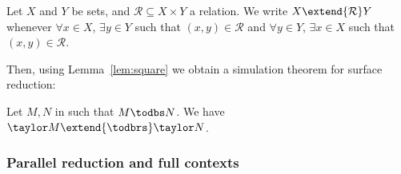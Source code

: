 \begin{definition} 
	Let $X$ and $Y$ be sets, and $\mathcal R\subseteq X\times Y$ a relation. We write
	$X\extend{\mathcal R} Y$ whenever $\forall x\in X$, $\exists y\in Y$ such that $(x,y)\in \mathcal R$
	and $\forall y\in Y$, $\exists x\in X$ such that $(x,y)\in \mathcal R$.
\end{definition}

Then, using Lemma~\ref{lem:square} we obtain a simulation theorem for
surface reduction:

\begin{theorem}[Simulation]
	\label{thm:simu_taylor_db}
	Let $M,N$ in \dbang{} such that $M\todbs N$. We have $\taylor M
	\extend{\todbrs} \taylor N$.
\end{theorem}


\subsubsection{Parallel reduction and full contexts}
\label{subsec:parallel}

